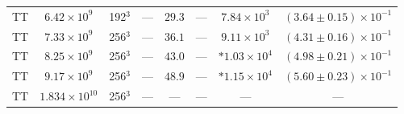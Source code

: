 \documentclass[aps, pre, onecolumn, nofootinbib, notitlepage, groupedaddress, amsfonts, amssymb, amsmath, longbibliography, superscriptaddress]{revtex4-1}
\begin{document}
\begin{table}[ht]
\begin{center}
\begin{tabularx}{\textwidth}{c c c c c c c c}
TT	&	$6.42 \times 10^9$		&	192$^3$				&	---					&	$29.3$			&	---		&	$7.84 \times 10^3$  & $(3.64 \pm 0.15) \times 10^{-1}$ \\
TT	&	$7.33 \times 10^9$		&	256$^3$				&	---					&	$36.1$			&	---		&	$9.11 \times 10^3$  & $(4.31 \pm 0.16) \times 10^{-1}$ \\
TT	&	$8.25 \times 10^9$		&	256$^3$				&	---					&	$43.0$			&	---		&	$*1.03 \times 10^4$ & $(4.98 \pm 0.21) \times 10^{-1}$ \\
TT	&	$9.17 \times 10^9$		&	256$^3$				&	---					&	$48.9$			&	---		&	$*1.15 \times 10^4$ & $(5.60 \pm 0.23) \times 10^{-1}$ \\
TT	&	$1.834 \times 10^{10}$	&	256$^3$				&	---					&	---				&	---		&	--- & --- \\
\hline																	
\end{tabularx}
\end{center}
\end{table}
\end{document}
